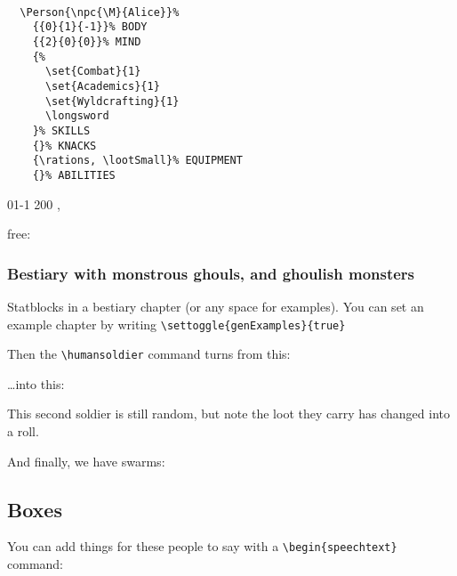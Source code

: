 \documentclass[a4paper,openany]{book}
\begin{document}
\begin{multicols}{2}
\begin{verbatim}

  \Person{\npc{\M}{Alice}}%
    {{0}{1}{-1}}% BODY
    {{2}{0}{0}}% MIND
    {%
      \set{Combat}{1}
      \set{Academics}{1}
      \set{Wyldcrafting}{1}
      \longsword
    }% SKILLS
    {}% KNACKS
    {\rations, \lootSmall}% EQUIPMENT
    {}% ABILITIES

\end{verbatim}


%
  {{0}{1}{-1}}%
  {{2}{0}{0}}%
  {%
    \shortsword
  }%
  {}%
  {\rations, \lootSmall}%
  {}%

free: 

\showNumbers

\subsubsection{Bestiary with monstrous ghouls, and ghoulish monsters}

Statblocks in a bestiary chapter (or any space for examples).
You can set an example chapter by writing \verb"\settoggle{genExamples}{true}"

Then the \verb"\humansoldier" command turns from this:


\humansoldier

\showNumbers

\ldots into this:


\humansoldier

\showNumbers

This second soldier is still random, but note the loot they carry has changed into a roll.

And finally, we have swarms:


\subsection{Boxes}

You can add things for these people to say with a \verb"\begin{speechtext}" command:

\begin{speechtext}


\end{speechtext}
\end{multicols}
\end{document}

